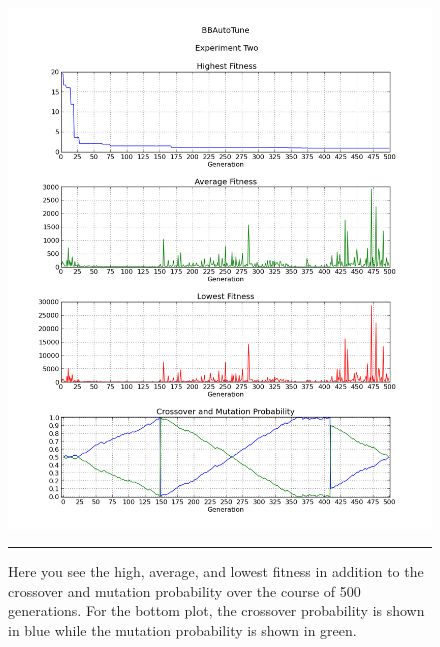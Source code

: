 \begin{figure}[htbp]
\centering
\includegraphics[width=5in]{../Figures/Chapter4/exp2_halcm.png}
\rule{35em}{0.5pt}
\caption[Experiment Two GA Metrics]{Here you see the high, average, and lowest fitness in addition to the crossover and mutation probability over the course of 500 generations. For the bottom plot, the crossover probability is shown in blue while the mutation probability is shown in green.}
\label{fig:exp2_halcm}
\end{figure}


